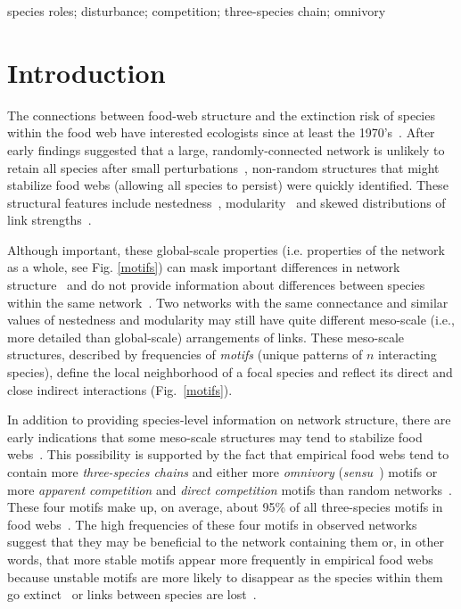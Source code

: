\documentclass[12pt]{article}
\begin{document}
\begin{spacing}{2.0}
	species roles; disturbance; competition; three-species chain; omnivory

\clearpage
    
\section*{Introduction}

	The connections between food-web structure and the extinction risk of species within the food web have interested ecologists since at least the 1970's~\citep{May1972}. After early findings suggested that a large, randomly-connected network is unlikely to retain all species after small perturbations~\citep{Gardner1970,May1972}, non-random structures that might stabilize food webs (allowing all species to persist) were quickly identified. These structural features include nestedness~\citep{Allesina2012,Sauve2014}, modularity~\citep{Sauve2014,Thebault2010} and skewed distributions of link strengths~\citep{McCann1998,Gross2009,Rooney2012,Wootton2016}.
	
	
	Although important, these global-scale properties (i.e. properties of the network as a whole, see Fig. \ref{motifs}) can mask important differences in  network structure~\citep{Simmons2019} and do not provide information about differences between species within the same network~\citep{Cirtwill2018FoodWebs}. 
	Two networks with the same connectance and similar values of nestedness and modularity may still have quite different meso-scale (i.e., more detailed than global-scale) arrangements of links. 
	These meso-scale structures, described by frequencies of \emph{motifs} (unique patterns of $n$ interacting species), define the local neighborhood of a focal species and reflect its direct and close indirect interactions (Fig.~\ref{motifs}).
	

    In addition to providing species-level information on network structure, there are early indications that some meso-scale structures may tend to stabilize food webs~\citep{Prill2005,Borrelli2015,Monteiro2016}. 
    This possibility is supported by the fact that empirical food webs tend to contain more \emph{three-species chains} and either more \emph{omnivory} (\emph{sensu}~\citealp[]{Thompson2007b}) motifs or more \emph{apparent competition} and \emph{direct competition} motifs than random networks~\citep{Stouffer2007}. 
    These four motifs make up, on average, about 95\% of all three-species motifs in food webs~\citep{Stouffer2010b}. 
    The high frequencies of these four motifs in observed networks suggest that they may be beneficial to the network containing them or, in other words, that more stable motifs appear more frequently in empirical food webs because unstable motifs are more likely to disappear as the species within them go extinct~\citep{Borrelli2015,Borrelli2015a} or links between species are lost~\citep{Tylianakis2010}.


\end{spacing}
\end{document}
